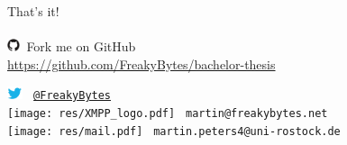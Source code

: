  
\begin{frame}{}{\mylogo}
	{\LARGE That's it!}\\[1.05em]
	\\[1.4em]
	
	\includegraphics[height=1em]{res/github.pdf}\ 
	Fork me on GitHub\\
	\textcolor{colorscheme}{\url{https://github.com/FreakyBytes/bachelor-thesis}}
	
	\includegraphics[height=1em]{res/twitter.png}
	\textcolor{colorscheme}{\tt\  \href{https://twitter.com/FreakyBytes}{@FreakyBytes}}\\
	
	\texttt{[image: res/XMPP\_logo.pdf]}
	\textcolor{colorscheme}{\tt\  martin@freakybytes.net}\\
	
	\texttt{[image: res/mail.pdf]}
	\textcolor{colorscheme}{\tt\  martin.peters4@uni-rostock.de} 
	
	
\end{frame}